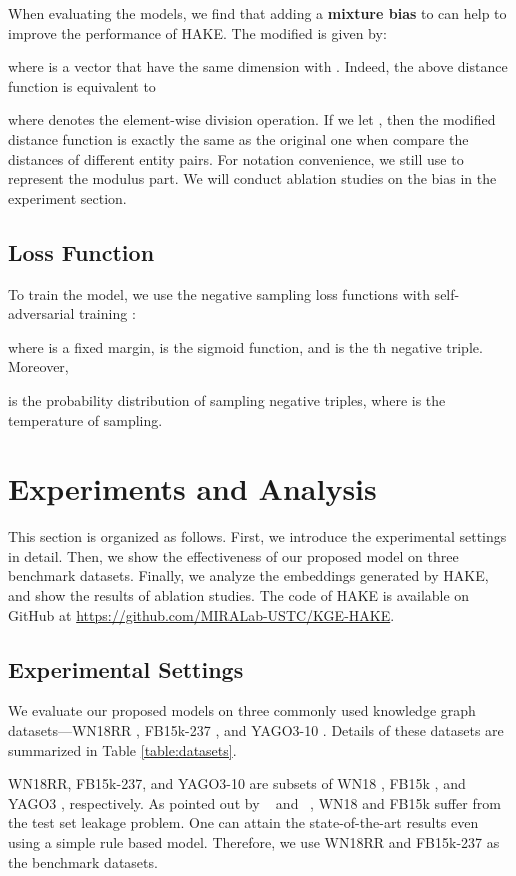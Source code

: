 \documentclass[letterpaper]{article} \usepackage{aaai20}  \usepackage{times}  \usepackage{helvet} \usepackage{courier}  \usepackage[hyphens]{url}  \usepackage{graphicx} \urlstyle{rm} \def\UrlFont{\rm}  \usepackage{graphicx}  \frenchspacing  \setlength{\pdfpagewidth}{8.5in}  \setlength{\pdfpageheight}{11in}
\newcommand{\citet}[1]{\citeauthor{#1}~\shortcite{#1}}
\newcommand{\citep}{\cite}
\begin{document}
When evaluating the models, we find that adding a \textbf{mixture bias} to  can help to improve the performance of HAKE. The modified  is given by:

where  is a vector that have the same dimension with .
Indeed, the above distance function is equivalent to 

where  denotes the element-wise division operation.
If we let , then the modified distance function is exactly the same as the original one when compare the distances of different entity pairs. For notation convenience, we still use  to represent the modulus part. We will conduct ablation studies on the bias in the experiment section.


\subsection{Loss Function}
To train the model, we use the negative sampling loss functions with self-adversarial training \citep{rotate}:

where  is a fixed margin,  is the sigmoid function, and  is the th negative triple. Moreover,

is the probability distribution of sampling negative triples, where  is the temperature of sampling.



\section{Experiments and Analysis}
This section is organized as follows. First, we introduce the experimental settings in detail. Then, we show the effectiveness of our proposed model on three benchmark datasets. Finally, we analyze the embeddings generated by HAKE, and show the results of ablation studies. The code of HAKE is available on GitHub at \url{https://github.com/MIRALab-USTC/KGE-HAKE}.

\subsection{Experimental Settings}
We evaluate our proposed models on three commonly used knowledge graph datasets---WN18RR \citep{wn18rr}, FB15k-237 \citep{conve}, and YAGO3-10 \citep{yago3}. Details of these datasets are summarized in Table \ref{table:datasets}.

WN18RR, FB15k-237, and YAGO3-10 are subsets of WN18 \citep{transe}, FB15k \citep{transe}, and YAGO3 \citep{yago3}, respectively.
As pointed out by \citet{wn18rr} and \citet{conve}, WN18 and FB15k suffer from the test set leakage problem. One can attain the state-of-the-art results even using a simple rule based model. Therefore, we use WN18RR and FB15k-237 as the benchmark datasets. 
\end{document}
